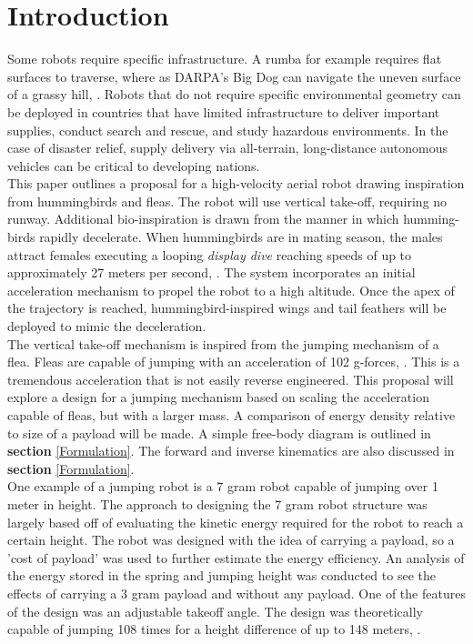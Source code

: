 \section{Introduction}
\label{intro}

\indent Some robots require specific infrastructure. A rumba for example requires flat surfaces to traverse, where as DARPA's Big Dog can navigate the uneven surface of a grassy hill, \cite{noauthor_bigdog_nodate}. Robots that do not require specific environmental geometry can be deployed in countries that have limited infrastructure to deliver important supplies, conduct search and rescue, and study hazardous environments. In the case of disaster relief, supply delivery via all-terrain, long-distance autonomous vehicles can be critical to developing nations.\\

\indent This paper outlines a proposal for a high-velocity aerial robot drawing
inspiration from hummingbirds and fleas. The robot will use vertical take-off, requiring no runway. Additional bio-inspiration is drawn from the manner in which humming-birds rapidly decelerate. When hummingbirds are in mating season, the males attract females executing a looping \textit{display dive} reaching speeds of up to approximately 27 meters per second, \cite{bennet-clark_jump_nodate}. The system incorporates an initial acceleration mechanism to propel the robot to a high altitude. Once the apex of the trajectory is reached, hummingbird-inspired wings and tail feathers will be deployed to mimic the deceleration.\\

\indent The vertical take-off mechanism is inspired from the jumping mechanism of a flea. Fleas are capable of jumping with an acceleration of 102 g-forces, \cite[p.~62]{bennet-clark_jump_nodate}. This is a tremendous acceleration that is not easily reverse engineered. This proposal will explore a design for a jumping mechanism based on scaling the acceleration capable of fleas, but with a larger mass. A comparison of energy density relative to size of a payload will be made. A simple free-body diagram is outlined in \textbf{section} \ref{Formulation}. The forward and inverse kinematics are also discussed in \textbf{section} \ref{Formulation}.\\

\indent One example of a jumping robot is a 7 gram robot capable of jumping over 1 meter in height. The approach to designing the 7 gram robot structure was largely based off of evaluating the kinetic energy required for the robot to reach a certain height. The robot was designed with the idea of carrying a payload, so a 'cost of payload' was used to further estimate the energy efficiency. An analysis of the energy stored in the spring and jumping height was conducted to see the effects of carrying a 3 gram payload and without any payload. One of the features of the design was an adjustable takeoff angle. The design was theoretically capable of jumping 108 times for a height difference of up to 148 meters, \cite{kovac_miniature_2008}. \\

